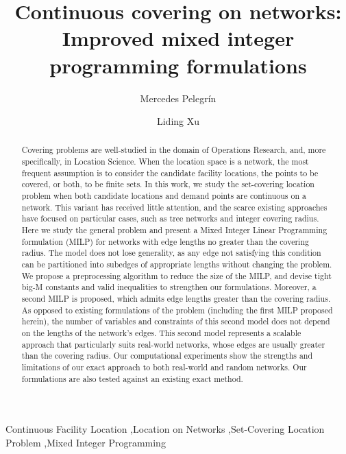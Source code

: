 \documentclass[review]{elsarticle}
\theoremstyle{definition}
\begin{document}
\begin{frontmatter}


\title{Continuous covering on networks: Improved mixed integer programming formulations}

\author[1,2,address]{Mercedes Pelegrín}

\author[1,address]{Liding Xu}

\address[address]{Laboratoire d'Informatique (LIX), École Polytechnique, 91128 Palaiseau, France}

\begin{abstract}
Covering problems are well-studied in the domain of Operations Research, and, more specifically, in Location Science.
When the location space is a network, the most frequent assumption is to consider the candidate facility locations, the points to be covered, or both, to be finite sets. In this work, we study the set-covering location problem when both candidate locations and demand points are continuous on a network. This variant has received little attention, and the scarce existing approaches have focused on particular cases, such as tree networks and integer covering radius. Here we study the general problem and present a Mixed Integer Linear Programming formulation (MILP) for networks with edge lengths no greater than the covering radius. The model does not lose generality, as any edge not satisfying this condition can be partitioned into subedges of appropriate lengths without changing the problem. We propose a preprocessing  algorithm to reduce the size of the MILP, and devise tight big-M constants and valid inequalities to strengthen our formulations. Moreover, a second MILP is proposed, which admits edge lengths greater than the covering radius. As opposed to existing formulations of the problem (including the first MILP proposed herein), the number of variables and constraints of this second model does not depend on the lengths of the network's edges. This second model represents a scalable approach that particularly suits real-world networks, whose edges are usually greater than the covering radius. Our computational experiments show the strengths and limitations of our exact approach to both real-world and random networks. Our formulations are also tested against an existing exact method.
\end{abstract}

\begin{keyword}
Continuous Facility Location \sep Location on Networks \sep Set-Covering Location Problem \sep Mixed Integer Programming
\end{keyword}

\end{frontmatter}
\end{document}
